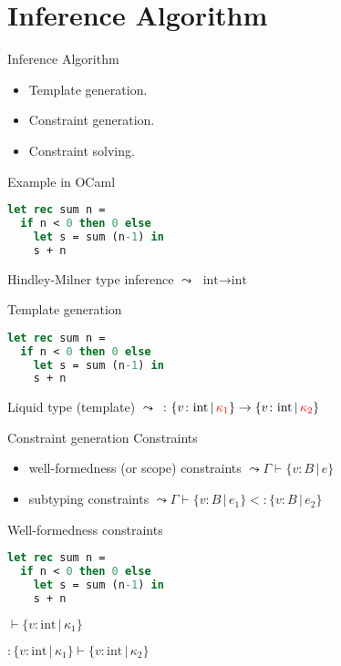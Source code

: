 \section{Inference Algorithm}


\begin{frame}[containsverbatim]{Inference Algorithm}
\begin{itemize}
    \item Template generation.
    \item Constraint generation.
    \item Constraint solving.
\end{itemize}
\end{frame}



\begin{frame}[containsverbatim]{Example in OCaml}
\begin{lstlisting}[language=ML, basicstyle=\small]
let rec sum n =
  if n < 0 then 0 else
    let s = sum (n-1) in
    s + n
\end{lstlisting}

Hindley-Milner type inference $\leadsto$ $\text{int}\rightarrow\text{int}$
\end{frame}



\begin{frame}[containsverbatim]{Template generation}
\begin{lstlisting}[language=ML, basicstyle=\small]
let rec sum n =
  if n < 0 then 0 else
    let s = sum (n-1) in
    s + n
\end{lstlisting}

Liquid type (template) $\leadsto$ $\colon\{v\colon\text{int}\,|\,{\color{red} \kappa_1}\}\rightarrow\{v\colon\text{int}\,|\,{\color{red} \kappa_2}\}$
\end{frame}

\begin{frame}[containsverbatim]{Constraint generation}
Constraints
\begin{itemize}
\item well-formedness (or scope) constraints $\leadsto \Gamma\vdash\{v\colon B\,|\,e\}$
\item subtyping constraints $\leadsto \Gamma\vdash\{v\colon B\,|\,e_1\} <\colon \{v\colon B\,|\,e_2\}$
\end{itemize}
\end{frame}

\begin{frame}[containsverbatim]{Well-formedness constraints}
\begin{lstlisting}[language=ML, basicstyle=\small]
let rec sum n =
  if n < 0 then 0 else
    let s = sum (n-1) in
    s + n
\end{lstlisting}
$\vdash\{v\colon\text{int}\,|\, \kappa_1\}$

$\colon\{v\colon\text{int}\,|\, \kappa_1\}\vdash\{v\colon\text{int}\,|\, \kappa_2\}$
\end{frame}

